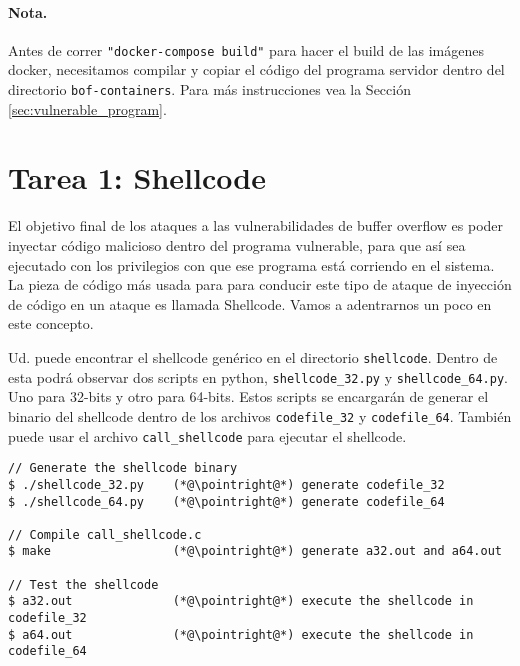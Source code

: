 


\paragraph{Nota.} Antes de correr \texttt{"docker-compose build"} para hacer el build de las imágenes docker, necesitamos compilar y copiar el código del programa servidor dentro del directorio \texttt{bof-containers}. Para más instrucciones vea la Sección  \ref{sec:vulnerable_program}.



\section{Tarea 1: Shellcode}
El objetivo final de los ataques a las vulnerabilidades de buffer overflow es poder inyectar código malicioso dentro del programa vulnerable, para que así sea ejecutado con los privilegios con que ese programa está corriendo en el sistema.
La pieza de código más usada para para conducir este tipo de ataque de inyección de código en un ataque es llamada Shellcode.
Vamos a adentrarnos un poco en este concepto.



Ud. puede encontrar el shellcode genérico en el directorio \texttt{shellcode}.
Dentro de esta podrá observar dos scripts en python, \texttt{shellcode\_32.py} y \texttt{shellcode\_64.py}. 
Uno para 32-bits y otro para 64-bits.
Estos scripts se encargarán de generar el binario del shellcode dentro de los archivos \texttt{codefile\_32} y \texttt{codefile\_64}.
También puede usar el archivo \texttt{call\_shellcode} para ejecutar el shellcode. 


\newcommand{\pointright}{\ding{221}}

\begin{lstlisting}
// Generate the shellcode binary 
$ ./shellcode_32.py    (*@\pointright@*) generate codefile_32
$ ./shellcode_64.py    (*@\pointright@*) generate codefile_64

// Compile call_shellcode.c
$ make                 (*@\pointright@*) generate a32.out and a64.out 

// Test the shellcode 
$ a32.out              (*@\pointright@*) execute the shellcode in codefile_32
$ a64.out              (*@\pointright@*) execute the shellcode in codefile_64
\end{lstlisting}
 

